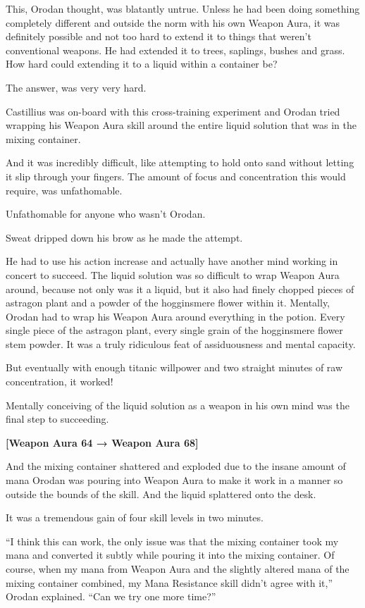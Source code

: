 \documentclass[a4paper,10pt]{book}
\begin{document}
This, Orodan thought, was blatantly untrue. Unless he had been doing something completely different and outside the norm with his own Weapon Aura, it was definitely possible and not too hard to extend it to things that weren’t conventional weapons. He had extended it to trees, saplings, bushes and grass. How hard could extending it to a liquid within a container be?\par
The answer, was very very hard.\par
Castillius was on-board with this cross-training experiment and Orodan tried wrapping his Weapon Aura skill around the entire liquid solution that was in the mixing container.\par
And it was incredibly difficult, like attempting to hold onto sand without letting it slip through your fingers. The amount of focus and concentration this would require, was unfathomable.\par
Unfathomable for anyone who wasn’t Orodan.\par
Sweat dripped down his brow as he made the attempt.\par
He had to use his action increase and actually have another mind working in concert to succeed. The liquid solution was so difficult to wrap Weapon Aura around, because not only was it a liquid, but it also had finely chopped pieces of astragon plant and a powder of the hogginsmere flower within it. Mentally, Orodan had to wrap his Weapon Aura around everything in the potion. Every single piece of the astragon plant, every single grain of the hogginsmere flower stem powder. It was a truly ridiculous feat of assiduousness and mental capacity.\par
But eventually with enough titanic willpower and two straight minutes of raw concentration, it worked!\par
Mentally conceiving of the liquid solution as a weapon in his own mind was the final step to succeeding.\par
\textbf{[Weapon Aura 64 → Weapon Aura 68]}\par
And the mixing container shattered and exploded due to the insane amount of mana Orodan was pouring into Weapon Aura to make it work in a manner so outside the bounds of the skill. And the liquid splattered onto the desk.\par
It was a tremendous gain of four skill levels in two minutes.\par
“I think this can work, the only issue was that the mixing container took my mana and converted it subtly while pouring it into the mixing container. Of course, when my mana from Weapon Aura and the slightly altered mana of the mixing container combined, my Mana Resistance skill didn’t agree with it,” Orodan explained. “Can we try one more time?”\par
\end{document}
